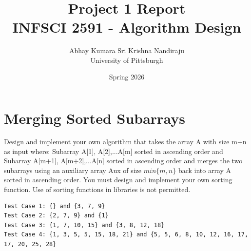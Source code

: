 \documentclass[11pt, a4paper]{article}
\title{\textbf{Project 1 Report}\\ \large INFSCI 2591 - Algorithm Design}
\author{Abhay Kumara Sri Krishna Nandiraju \\ University of Pittsburgh}
\date{Spring 2026}
\begin{document}
\maketitle


\section{Merging Sorted Subarrays}
Design and implement your own algorithm that takes the array A with size m+n as input where:
Subarray A[1], A[2],...A[m] sorted in ascending order and 
Subarray A[m+1], A[m+2],...A[n] sorted in ascending order
and merges the two subarrays using an auxiliary array Aux of size $min\{m,n\}$ back into array A sorted in ascending order. You must design and implement your own sorting function. Use of sorting functions in libraries is not permitted. 
\begin{verbatim}
Test Case 1: {} and {3, 7, 9}
Test Case 2: {2, 7, 9} and {1}
Test Case 3: {1, 7, 10, 15} and {3, 8, 12, 18}
Test Case 4: {1, 3, 5, 5, 15, 18, 21} and {5, 5, 6, 8, 10, 12, 16, 17, 17, 20, 25, 28}
\end{verbatim}



\end{document}

